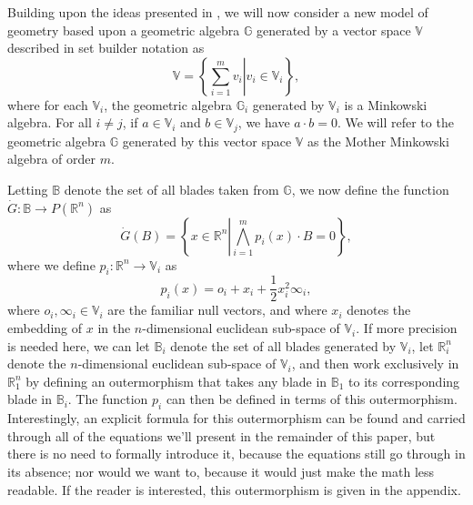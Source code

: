 \documentclass{ecgd-l}
\numberwithin{equation}{section}
\newcommand{\R}{\mathbb{R}}
\newcommand{\B}{\mathbb{B}}
\newcommand{\G}{\mathbb{G}}
\newcommand{\V}{\mathbb{V}}
\newcommand{\Gd}{\dot{G}}
\newcommand{\nvai}{\infty}
\newcommand{\nvao}{o}
\begin{document}
Building upon the ideas presented in \cite{DoranHestenes93}, we will now consider
a new model of geometry based upon a geometric algebra $\G$
generated by a vector space $\V$ described in set builder notation as
\begin{equation*}
\V = \left\{\left.\sum_{i=1}^m v_i\right|v_i\in\V_i\right\},
\end{equation*}
where for each $\V_i$, the geometric algebra $\G_i$ generated by $\V_i$
is a Minkowski algebra.  For all $i\neq j$, if $a\in\V_i$
and $b\in\V_j$, we have $a\cdot b=0$.  We will refer to the geometric algebra $\G$
generated by this vector space $\V$ as the Mother Minkowski algebra of order $m$.

Letting $\B$ denote the set
of all blades taken from $\G$, we now define the function $\Gd:\B\to P(\R^n)$ as
\begin{equation}\label{equ_Gd}
\Gd(B) = \left\{x\in\R^n\left|\bigwedge_{i=1}^m p_i(x)\cdot B=0\right\}\right.,
\end{equation}
where we define $p_i:\R^n\to\V_i$ as
\begin{equation}\label{equ_p_i}
p_i(x) = \nvao_i + x_i + \frac{1}{2}x_i^2\nvai_i,
\end{equation}
where $\nvao_i,\nvai_i\in\V_i$ are the familiar null vectors, and where $x_i$ denotes the embedding
of $x$ in the $n$-dimensional euclidean sub-space of $\V_i$.  If more precision is needed here,
we can let $\B_i$ denote the set of all blades generated by $\V_i$,
let $\R_i^n$ denote the $n$-dimensional euclidean sub-space of $\V_i$, and then
work exclusively in $\R_1^n$ by defining an outermorphism that takes any blade in $\B_1$
to its corresponding blade in $\B_i$.  The function $p_i$ can then be defined in terms
of this outermorphism.  Interestingly, an explicit formula for this outermorphism can be found and carried through
all of the equations we'll present in the remainder of this paper, but there is no need to
formally introduce it, because the equations still go through in its absence; nor would we want to,
because it would just make the math less readable.  If the reader is
interested, this outermorphism is given in the appendix.
\end{document}
